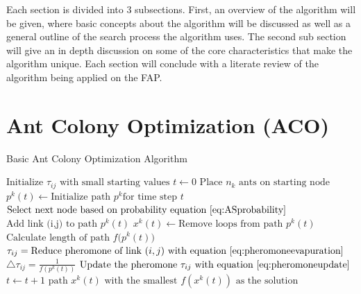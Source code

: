 Each section is divided into 3 subsections. First, an overview of the algorithm will be given, where basic concepts about the algorithm will be discussed as well as a general outline of the search process the algorithm uses. The second sub section will give an in depth discussion on some of the core characteristics that make the algorithm unique. Each section will conclude with a literate review of the algorithm being applied on the FAP.

\section{Ant Colony Optimization (ACO)}
\begin{algorithm}
\caption{Basic Ant Colony Optimization Algorithm~\cite{CompuIntelligenceIntro}}
\label{alg:ACO}
	\begin{algorithmic}[1]
	\STATE$\text{Initialize $\tau_{ij}$ with small starting values}$
	\STATE$t \leftarrow 0$
	\STATE$\text{Place $n_k$ ants on starting node}$
			\STATE$p^k(t) \leftarrow \text{Initialize path } p^k \text{for time step } t$
			\REPEAT
				\STATE$\text{Select next node based on probability equation~\ref{eq:ASprobability}}$
				\STATE$\text{Add link (i,j) to path } p^k(t)$
			\STATE$x^k(t) \leftarrow \text{Remove loops from path }p^k(t)$
			\STATE$\text{Calculate length of path $f(p^k(t)$})$
		\ENDFOR
			\STATE$\tau_{ij} = \text{Reduce pheromone of link $(i,j)$ with equation~\ref{eq:pheromoneevapuration}}$
		\ENDFOR
				\STATE$\triangle \tau_{ij} = \frac{1}{f(p^k(t))}$
				\STATE$\text{Update the pheromone $\tau_{ij}$ with equation~\ref{eq:pheromoneupdate}}$
			\ENDFOR
		\ENDFOR
		\STATE$t \leftarrow t + 1$
	\ENDWHILE
	\RETURN $\text{path $x^k(t)$ with the smallest $f(x^k(t))$ as the solution}$
	\end{algorithmic}
\end{algorithm}
\label{sec:ACO}
